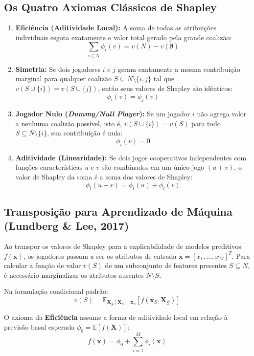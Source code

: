 \documentclass[11pt,a4paper]{article}
\begin{document}
\subsection{Os Quatro Axiomas Clássicos de Shapley}

\begin{enumerate}[leftmargin=*]
  \item \textbf{Eficiência (Aditividade Local):} A soma de todas as atribuições individuais esgota exatamente o valor total gerado pela grande coalizão:
  $$\sum_{i \in N} \phi_i(v) = v(N) - v(\emptyset)$$
  \item \textbf{Simetria:} Se dois jogadores $i$ e $j$ geram exatamente a mesma contribuição marginal para qualquer coalizão $S \subseteq N \setminus \{i, j\}$ tal que $v(S \cup \{i\}) = v(S \cup \{j\})$, então seus valores de Shapley são idênticos:
  $$\phi_i(v) = \phi_j(v)$$
  \item \textbf{Jogador Nulo (\textit{Dummy/Null Player}):} Se um jogador $i$ não agrega valor a nenhuma coalizão possível, isto é, $v(S \cup \{i\}) = v(S)$ para todo $S \subseteq N \setminus \{i\}$, sua contribuição é nula:
  $$\phi_i(v) = 0$$
  \item \textbf{Aditividade (Linearidade):} Se dois jogos cooperativos independentes com funções características $u$ e $v$ são combinados em um único jogo $(u + v)$, o valor de Shapley da soma é a soma dos valores de Shapley:
  $$\phi_i(u + v) = \phi_i(u) + \phi_i(v)$$
\end{enumerate}

\subsection{Transposição para Aprendizado de Máquina (Lundberg \& Lee, 2017)}

Ao transpor os valores de Shapley para a explicabilidade de modelos preditivos $f(\mathbf{x})$, os jogadores passam a ser os atributos de entrada $\mathbf{x} = [x_1, \dots, x_M]^T$. Para calcular a função de valor $v(S)$ de um subconjunto de features presentes $S \subseteq N$, é necessário marginalizar os atributos ausentes $N \setminus S$. 

Na formulação condicional padrão:
$$v(S) = \mathbb{E}_{\mathbf{X}_{\bar{S}} \mid \mathbf{X}_S = \mathbf{x}_S} \left[ f(\mathbf{x}_S, \mathbf{X}_{\bar{S}}) \right]$$

O axioma da \textbf{Eficiência} assume a forma de aditividade local em relação à previsão basal esperada $\phi_0 = \mathbb{E}[f(\mathbf{X})]$:
$$f(\mathbf{x}) = \phi_0 + \sum_{i=1}^M \phi_i(\mathbf{x})$$
\end{document}
